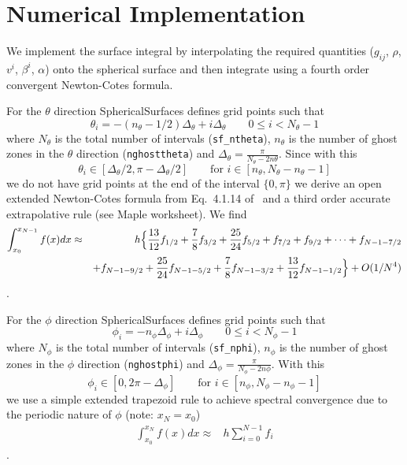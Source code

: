 \section{Numerical Implementation}
We implement the surface integral by interpolating the required quantities
($g_{ij}$, $\rho$, $v^i$, $\beta^i$, $\alpha$) onto the spherical surface and
then integrate using a fourth order convergent Newton-Cotes formula. 

For the
$\theta$ direction SphericalSurfaces defines grid points such that
\begin{displaymath}
    \theta_i = -(n_\theta - 1/2) \Delta_\theta + i \Delta_\theta \qquad
    0 \le i < N_\theta-1
\end{displaymath}
where $N_\theta$ is the total number of intervals (\verb|sf_ntheta|),
$n_\theta$ is the number of ghost zones in the $\theta$ direction
(\verb|nghosttheta|) and $\Delta_\theta = \frac{\pi}{N_\theta-2n\theta}$.
Since with this 
\begin{displaymath}
    \theta_i \in [\Delta_\theta/2, \pi - \Delta_\theta/2] \qquad 
    \mbox{for $i \in [n_\theta, N_\theta-n_\theta-1]$}
\end{displaymath}
we do not have grid points at the end of the interval $\{0,\pi\}$ we derive
an open extended Newton-Cotes formula from Eq.~4.1.14 of~\cite{nr-cpp-2nd} and
a third order accurate extrapolative rule (see Maple worksheet). We find
\begin{eqnarray}
    \int_{x_0}^{x_{N-1}} f(x) dx &\approx& h \Bigl\{ 
    \frac{13}{12} f_{1/2} + \frac{7}{8} f_{3/2} + \frac{25}{24} f_{5/2} +
    f_{7/2} + f_{9/2} + \cdots + f_{N-1-7/2} \nonumber \\
    && + f_{N-1-9/2}
    + \frac{25}{24} f_{N-1-5/2} + \frac{7}{8} f_{N-1-3/2} + \frac{13}{12} f_{N-1-1/2}
    \Bigr\} + O(1/N^4)
\end{eqnarray}.

For the
$\phi$ direction SphericalSurfaces defines grid points such that
\begin{displaymath}
    \phi_i = -n_\phi \Delta_\phi + i \Delta_\phi \qquad
    0 \le i < N_\phi-1
\end{displaymath}
where $N_\phi$ is the total number of intervals (\verb|sf_nphi|),
$n_\phi$ is the number of ghost zones in the $\phi$ direction
(\verb|nghostphi|) and $\Delta_\phi = \frac{\pi}{N_\phi-2n\phi}$.
With this 
\begin{displaymath}
    \phi_i \in [0, 2 \pi - \Delta_\phi] \qquad 
    \mbox{for $i \in [n_\phi, N_\phi-n_\phi-1]$}
\end{displaymath}
we use a simple extended trapezoid rule to achieve spectral convergence due to
the periodic nature of $\phi$ (note: $x_N = x_0$)
\begin{eqnarray}
    \int_{x_0}^{x_N} f(x) dx  \approx& h \sum_{i=0}^{N-1} f_i
\end{eqnarray}.

